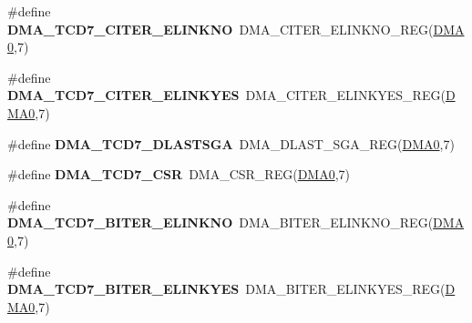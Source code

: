 \begin{DoxyCompactItemize}
\item 
\#define {\bfseries D\+M\+A\+\_\+\+T\+C\+D7\+\_\+\+C\+I\+T\+E\+R\+\_\+\+E\+L\+I\+N\+K\+NO}~D\+M\+A\+\_\+\+C\+I\+T\+E\+R\+\_\+\+E\+L\+I\+N\+K\+N\+O\+\_\+\+R\+EG(\hyperlink{group__DMA__Peripheral__Access__Layer_ga4103044f9ca209772f513dc694513ffb}{D\+M\+A0},7)\hypertarget{group__DMA__Register__Accessor__Macros_ga031018c1c2650eee7cf7606861bf9fba}{}\label{group__DMA__Register__Accessor__Macros_ga031018c1c2650eee7cf7606861bf9fba}

\item 
\#define {\bfseries D\+M\+A\+\_\+\+T\+C\+D7\+\_\+\+C\+I\+T\+E\+R\+\_\+\+E\+L\+I\+N\+K\+Y\+ES}~D\+M\+A\+\_\+\+C\+I\+T\+E\+R\+\_\+\+E\+L\+I\+N\+K\+Y\+E\+S\+\_\+\+R\+EG(\hyperlink{group__DMA__Peripheral__Access__Layer_ga4103044f9ca209772f513dc694513ffb}{D\+M\+A0},7)\hypertarget{group__DMA__Register__Accessor__Macros_ga7595d3fc88edbc275e9f21568d55e382}{}\label{group__DMA__Register__Accessor__Macros_ga7595d3fc88edbc275e9f21568d55e382}

\item 
\#define {\bfseries D\+M\+A\+\_\+\+T\+C\+D7\+\_\+\+D\+L\+A\+S\+T\+S\+GA}~D\+M\+A\+\_\+\+D\+L\+A\+S\+T\+\_\+\+S\+G\+A\+\_\+\+R\+EG(\hyperlink{group__DMA__Peripheral__Access__Layer_ga4103044f9ca209772f513dc694513ffb}{D\+M\+A0},7)\hypertarget{group__DMA__Register__Accessor__Macros_ga23e818dc306809fc9a3a2b7e46a69ef0}{}\label{group__DMA__Register__Accessor__Macros_ga23e818dc306809fc9a3a2b7e46a69ef0}

\item 
\#define {\bfseries D\+M\+A\+\_\+\+T\+C\+D7\+\_\+\+C\+SR}~D\+M\+A\+\_\+\+C\+S\+R\+\_\+\+R\+EG(\hyperlink{group__DMA__Peripheral__Access__Layer_ga4103044f9ca209772f513dc694513ffb}{D\+M\+A0},7)\hypertarget{group__DMA__Register__Accessor__Macros_ga3e5e4f7009e022d05759c2c0fe27f647}{}\label{group__DMA__Register__Accessor__Macros_ga3e5e4f7009e022d05759c2c0fe27f647}

\item 
\#define {\bfseries D\+M\+A\+\_\+\+T\+C\+D7\+\_\+\+B\+I\+T\+E\+R\+\_\+\+E\+L\+I\+N\+K\+NO}~D\+M\+A\+\_\+\+B\+I\+T\+E\+R\+\_\+\+E\+L\+I\+N\+K\+N\+O\+\_\+\+R\+EG(\hyperlink{group__DMA__Peripheral__Access__Layer_ga4103044f9ca209772f513dc694513ffb}{D\+M\+A0},7)\hypertarget{group__DMA__Register__Accessor__Macros_ga52ee5bb622bffc9bb99342293afbd4ba}{}\label{group__DMA__Register__Accessor__Macros_ga52ee5bb622bffc9bb99342293afbd4ba}

\item 
\#define {\bfseries D\+M\+A\+\_\+\+T\+C\+D7\+\_\+\+B\+I\+T\+E\+R\+\_\+\+E\+L\+I\+N\+K\+Y\+ES}~D\+M\+A\+\_\+\+B\+I\+T\+E\+R\+\_\+\+E\+L\+I\+N\+K\+Y\+E\+S\+\_\+\+R\+EG(\hyperlink{group__DMA__Peripheral__Access__Layer_ga4103044f9ca209772f513dc694513ffb}{D\+M\+A0},7)\hypertarget{group__DMA__Register__Accessor__Macros_ga93ea45ae3f261c96d302fc05caf8c74f}{}\label{group__DMA__Register__Accessor__Macros_ga93ea45ae3f261c96d302fc05caf8c74f}


\end{DoxyCompactItemize}
